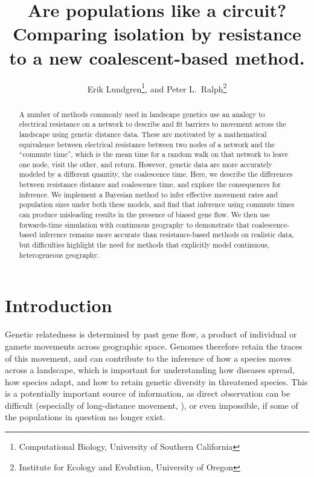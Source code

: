 \documentclass{article}
\begin{document}
\title{Are populations like a circuit? 
Comparing isolation by resistance to a new coalescent-based method.}
\author{Erik Lundgren\footnote{Computational Biology, University of Southern California}, and
        Peter L.\ Ralph\footnote{Institute for Ecology and Evolution, University of Oregon}}
\maketitle

\linenumbers

\begin{abstract}
A number of methods commonly used in landscape genetics
use an analogy to electrical resistance on a network
to describe and fit barriers to movement across the landscape
using genetic distance data.
These are motivated by a mathematical equivalence between electrical resistance 
between two nodes of a network
and the ``commute time'',
which is the mean time for a random walk on that network to leave one node, visit the other, and return.
However, genetic data are more accurately modeled by a different quantity,
the coalescence time.
Here, we describe the differences between resistance distance and coalescence time,
and explore the consequences for inference.
We implement a Bayesian method to infer effective movement rates and population sizes 
under both these models,
and find that inference using commute times
can produce misleading results in the presence of biased gene flow.
We then use forwards-time simulation with continuous geography to demonstrate that
coalescence-based inference remains more accurate than resistance-based methods on realistic data,
but difficulties highlight the need for methods 
that explicitly model continuous, heterogeneous geography.
\end{abstract}


\section*{Introduction}

Genetic relatedness is determined by past gene flow,
a product of individual or gamete movements across geographic space.
Genomes therefore retain the traces of this movement,
and can contribute to the inference of how a species moves across a landscape,
which is important for understanding how diseases spread, how species adapt,
and how to retain genetic diversity in threatened species.
This is a potentially important source of information,
as direct observation can be difficult 
(especially of long-distance movement, \citep{cayuelademographic,levin_et_al_seed_dispersal}),
or even impossible, if some of the populations in question no longer exist. 
\end{document}
